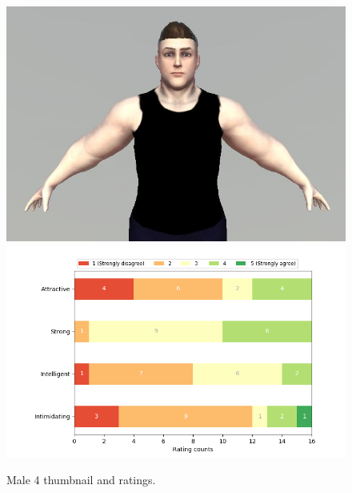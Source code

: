 \begin{figure}[H]
  \includegraphics[width=\linewidth]{Images/Males/4.JPG}
\endminipage\hfill
{}
  \includegraphics[width=\linewidth]{Survey/MRatings/avatar_m4.png}
\endminipage\hfill
\caption{Male 4 thumbnail and ratings.}
\end{figure}

